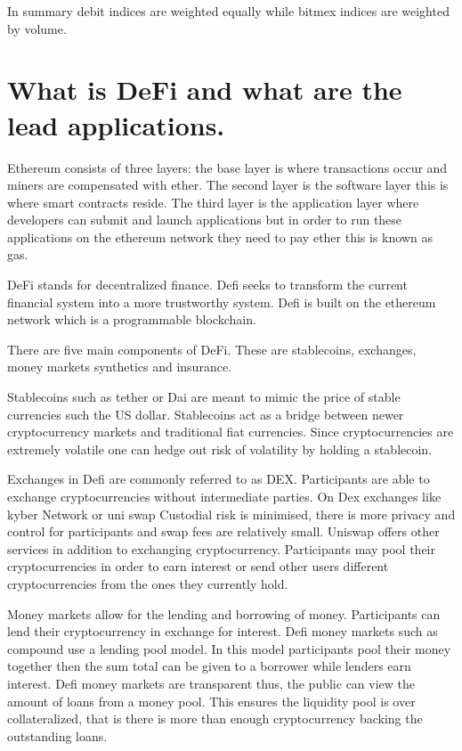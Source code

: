 In summary debit indices are weighted equally while bitmex indices are weighted by volume.

    
\section{ What is DeFi and what are the lead applications.}

Ethereum consists of three layers: the base layer is where transactions occur  and miners are compensated with ether. The second layer is the software layer this is where smart contracts reside. The third layer is the application layer where developers can submit and launch applications but in order to run these applications on the ethereum network they need to pay ether this is known as gas. 

DeFi stands for decentralized finance. Defi seeks to transform the current financial system into a more trustworthy system. Defi is built on the ethereum network which is a programmable blockchain. 

There are five main components of DeFi. These are stablecoins, exchanges, money markets synthetics and insurance. 

Stablecoins such as tether or Dai are meant to mimic the price of stable currencies such the US dollar.  Stablecoins act as a bridge between newer cryptocurrency markets and traditional fiat currencies. Since cryptocurrencies are extremely volatile one can hedge out risk of volatility by holding a stablecoin.


Exchanges in Defi are commonly referred to as DEX. Participants are able to exchange cryptocurrencies without intermediate parties. On Dex exchanges like kyber Network or uni swap  Custodial risk is minimised, there is more privacy and control for participants and swap fees are relatively small. Uniswap offers other services in addition to exchanging cryptocurrency. Participants may pool their cryptocurrencies in order to earn interest or send other users different cryptocurrencies from the ones they currently hold.

Money markets allow for the lending and borrowing of money. Participants can lend their cryptocurrency in exchange for interest. Defi money markets such as compound use a lending pool model.   In this model participants pool their money together then the sum total can be given to a borrower while lenders earn interest. Defi money markets are transparent thus, the public can view the amount of loans from a money pool. This ensures the liquidity pool is over collateralized, that is there is more than enough cryptocurrency backing the outstanding loans. 


